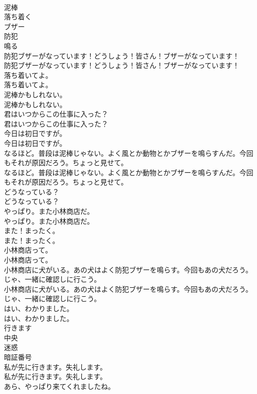 \documentclass[8pt]{extreport}
\begin{document}
\begin{CJK}{UTF8}{min}
\\	泥棒
\\	落ち着く
\\	ブザー
\\	防犯
\\	鳴る
\\	防犯ブザーがなっています！どうしょう！皆さん！ブザーがなっています！	
\\	防犯ブザーがなっています！どうしょう！皆さん！ブザーがなっています！ 
\\	落ち着いてよ。	
\\	落ち着いてよ。 
\\	泥棒かもしれない。	
\\	泥棒かもしれない。 
\\	君はいつからこの仕事に入った？	
\\	君はいつからこの仕事に入った？ 
\\	今日は初日ですが。	
\\	今日は初日ですが。 
\\	なるほど。普段は泥棒じゃない。よく風とか動物とかブザーを鳴らすんだ。今回もそれが原因だろう。ちょっと見せて。	
\\	なるほど。普段は泥棒じゃない。よく風とか動物とかブザーを鳴らすんだ。今回もそれが原因だろう。ちょっと見せて。 
\\	どうなっている？	
\\	どうなっている？ 
\\	やっぱり。また小林商店だ。	
\\	やっぱり。また小林商店だ。 
\\	また！まったく。	
\\	また！まったく。 
\\	小林商店って。	
\\	小林商店って。 
\\	小林商店に犬がいる。あの犬はよく防犯ブザーを鳴らす。今回もあの犬だろう。じゃ、一緒に確認しに行こう。	
\\	小林商店に犬がいる。あの犬はよく防犯ブザーを鳴らす。今回もあの犬だろう。じゃ、一緒に確認しに行こう。 
\\	はい、わかりました。	
\\	はい、わかりました。 
\\	行きます
\\	中央
\\	迷惑
\\	暗証番号
\\	私が先に行きます。失礼します。	
\\	私が先に行きます。失礼します。 
\\	あら、やっぱり来てくれましたね。	

\end{CJK}
\end{document}
